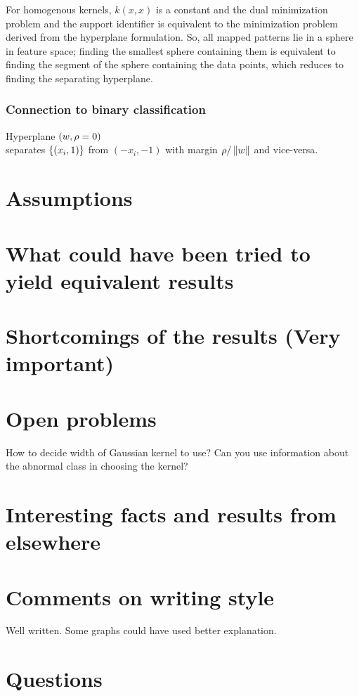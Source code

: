 \documentclass[10pt]{amsart}
\begin{document}
For homogenous kernels, $k(x,x)$ is a constant and the dual minimization problem and the support identifier is equivalent to the minimization problem derived from the hyperplane formulation. So, all mapped patterns lie in a sphere in feature space; finding the smallest sphere containing them is equivalent to finding the segment of the sphere containing the data points, which reduces to finding the separating hyperplane.

\subsubsection{Connection to binary classification}
Hyperplane $(w, \gr = 0)$ \\
separates $\set{(x_{i}, 1)}$ from $(-x_{i}, -1)$ with margin $\gr/\norm{w}$ and vice-versa.


\section{Assumptions}

\section{What could have been tried to yield equivalent results}

\section{Shortcomings of the results (Very important)}


\section{Open problems}
\oprob How to decide width of Gaussian kernel to use? Can you use information about the abnormal class in choosing the kernel?

\section{Interesting facts and results from elsewhere}


\section{Comments on writing style}
Well written. Some graphs could have used better explanation.

\section{Questions}
\end{document}
